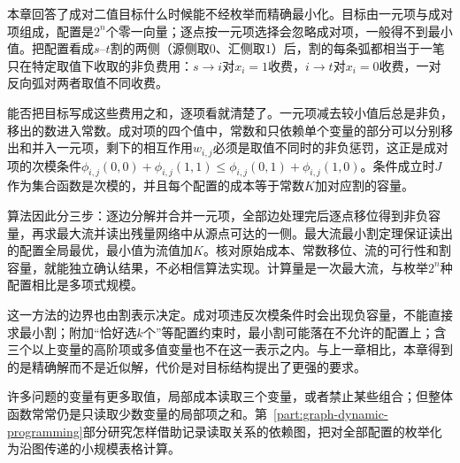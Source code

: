 本章回答了成对二值目标什么时候能不经枚举而精确最小化。目标由一元项与成对项组成，配置是$2^n$个零一向量；逐点按一元项选择会忽略成对项，一般得不到最小值。把配置看成$s$--$t$割的两侧（源侧取$0$、汇侧取$1$）后，割的每条弧都相当于一笔只在特定取值下收取的非负费用：$s\to i$对$x_i=1$收费，$i\to t$对$x_i=0$收费，一对反向弧对两者取值不同收费。

能否把目标写成这些费用之和，逐项看就清楚了。一元项减去较小值后总是非负，移出的数进入常数。成对项的四个值中，常数和只依赖单个变量的部分可以分别移出和并入一元项，剩下的相互作用$w_{i,j}$必须是取值不同时的非负惩罚，这正是成对项的次模条件$\phi_{i,j}(0,0)+\phi_{i,j}(1,1)\leq\phi_{i,j}(0,1)+\phi_{i,j}(1,0)$。条件成立时$J$作为集合函数是次模的，并且每个配置的成本等于常数$K$加对应割的容量。

算法因此分三步：逐边分解并合并一元项，全部边处理完后逐点移位得到非负容量，再求最大流并读出残量网络中从源点可达的一侧。最大流最小割定理保证读出的配置全局最优，最小值为流值加$K$。核对原始成本、常数移位、流的可行性和割容量，就能独立确认结果，不必相信算法实现。计算量是一次最大流，与枚举$2^n$种配置相比是多项式规模。

这一方法的边界也由割表示决定。成对项违反次模条件时会出现负容量，不能直接求最小割；附加“恰好选$k$个”等配置约束时，最小割可能落在不允许的配置上；含三个以上变量的高阶项或多值变量也不在这一表示之内。与上一章相比，本章得到的是精确解而不是近似解，代价是对目标结构提出了更强的要求。

许多问题的变量有更多取值，局部成本读取三个变量，或者禁止某些组合；但整体函数常常仍是只读取少数变量的局部项之和。第~\ref{part:graph-dynamic-programming}部分研究怎样借助记录读取关系的依赖图，把对全部配置的枚举化为沿图传递的小规模表格计算。
